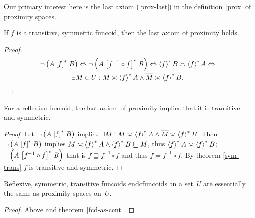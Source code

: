 Our primary interest here is the last axiom (\ref{prox-last}) in
the definition~\ref{prox} of proximity spaces.
\begin{prop}
If $f$ is a transitive, symmetric funcoid, then the last axiom of
proximity holds.\end{prop}
\begin{proof}
~
\begin{multline*}
\neg\left(A\mathrel{\left[f\right]^{\ast}}B\right)\Leftrightarrow\neg\left(A\mathrel{\left[f^{-1}\circ
f\right]^{\ast}}B\right)\Leftrightarrow\left\langle f\right\rangle ^{\ast}B\asymp\left\langle f\right\rangle ^{\ast}A\Leftrightarrow\\
\exists M\in U:M\asymp\left\langle f\right\rangle ^{\ast}A\wedge\overline{M}\asymp\left\langle f\right\rangle ^{\ast}B.
\end{multline*}
\end{proof}
\begin{prop}
For a reflexive funcoid, the last axiom of proximity implies that
it is transitive and symmetric.\end{prop}
\begin{proof}
Let $\neg\left(A\mathrel{\left[f\right]^{\ast}}B\right)$ implies $\exists M:M\asymp\left\langle f\right\rangle ^{\ast}A\wedge\overline{M}\asymp\left\langle f\right\rangle ^{\ast}B$.
Then $\neg\left(A\mathrel{\left[f\right]^{\ast}}B\right)$ implies $M\asymp\left\langle f\right\rangle ^{\ast}A\land\left\langle f\right\rangle ^{\ast}B\sqsubseteq M$,
thus $\left\langle f\right\rangle ^{\ast}A\asymp\left\langle f\right\rangle ^{\ast}B$; $\neg\left(A\mathrel{\left[f^{-1}\circ
f\right]^{\ast}}B\right)$
that is $f\sqsupseteq f^{-1}\circ f$ and thus $f=f^{-1}\circ f$.
By theorem \ref{sym-trans} $f$ is transitive and symmetric.\end{proof}
\begin{thm}
Reflexive, symmetric, transitive funcoids endofuncoids on a set~$U$
are essentially the same as proximity spaces on~$U$.\end{thm}
\begin{proof}
Above and theorem~\ref{fcd-as-cont}.\end{proof}

